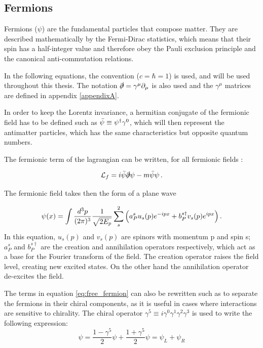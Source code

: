 \subsection{Fermions}

Fermions ($\psi$) are the fundamental particles that compose matter. They are described mathematically by the Fermi-Dirac statistics, which means that their spin has a half-integer value and therefore obey the Pauli exclusion principle and the canonical anti-commutation relations.

In the following equations, the convention ($c = \hbar = 1$) is used, and will be used throughout this thesis. The notation $\slashed{\partial} = \gamma^{\mu}\partial_{\mu}$ is also used and the $\gamma^{\mu}$ matrices are defined in appendix \ref{appendixA}. \newline

In order to keep the Lorentz invariance, a hermitian conjugate of the fermionic field has to be defined such as $\Bar{\psi} \equiv \psi^{\dagger}\gamma^0$, which will then represent the antimatter particles, which has the same characteristics but opposite quantum numbers.\newline

The fermionic term of the lagrangian can be written, for all fermionic fields :

\begin{equation}
    \Lagr_f = i\Bar{\psi}\slashed{\partial}\psi - m\Bar{\psi}\psi \mend
    \label{eq:free_fermion}
\end{equation}

The fermionic field takes then the form of a plane wave 

\begin{equation}
    \psi(x) = \int \frac{d^3 p}{(2\pi)^3} \frac{1}{\sqrt{2E_p}} \sum^{2}_{s} \Big( a^{s}_{P} u_s (p)e^{-ipx} + b^{s\dagger}_P v_s (p)e^{ipx} \Big) \mend
\end{equation}
In this equation, $u_s (p)$ and $v_s (p)$ are spinors with momentum p and spin s; $a^{s}_P$ and $b^{s\dagger}_P$ are the creation and annihilation operators respectively, which act as a base for the Fourier transform of the field. The creation operator raises the field level, creating new excited states. On the other hand the annihilation operator de-excites the field.

The terms in equation \ref{eq:free_fermion} can also be rewritten such as to separate the fermions in their chiral components, as it is useful in cases where interactions are sensitive to chirality. The chiral operator $\gamma^5 \equiv i\gamma^0 \gamma^1 \gamma^2 \gamma^3$ is used to write the following expression:
\begin{equation}
    \psi = \frac{1- \gamma^5}{2}\psi + \frac{1+ \gamma^5}{2}\psi = \psi_L + \psi_R
\end{equation}

